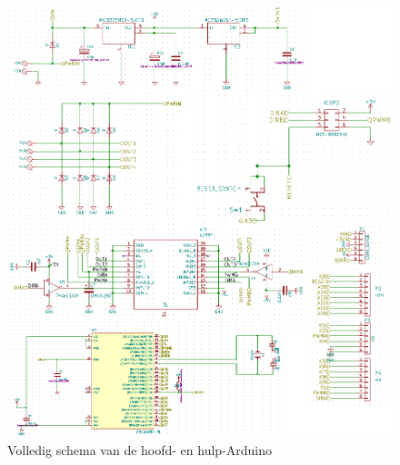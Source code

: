 \begin{figure}[h]
\centering
\includegraphics[width=1\textwidth]{volledigschema}
\caption{Volledig schema van de hoofd- en hulp-Arduino}
\label{schema}
\end{figure}
